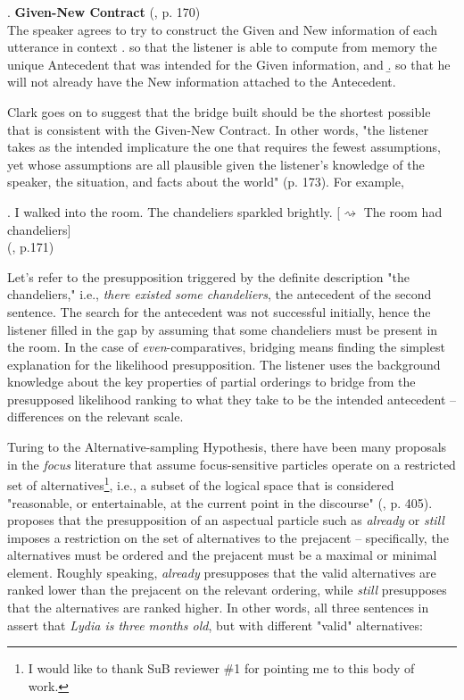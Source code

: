 \documentclass[12pt,letterpaper]{scrartcl}
\newcommand{\alignright}{\hspace*{\fill}}
\newcommand{\infer}{$\rightsquigarrow$ }
\begin{document}
\ex. \textbf{Given-New Contract} (\cite{clark_bridging_1975}, p. 170) \\
The speaker agrees to try to construct the Given and New information of each utterance in context
\a. so that the listener is able to compute from memory the unique Antecedent that was intended for the Given information, and
\b. so that he will not already have the New information attached to the Antecedent.

Clark goes on to suggest that the bridge built should be the shortest possible that is consistent with the Given-New Contract. In other words, "the listener takes as the intended implicature the one that requires the fewest assumptions, yet whose assumptions are all plausible given the listener's knowledge of the speaker, the situation, and facts about the world" (p. 173). For example,

\ex. I walked into the room. The chandeliers sparkled brightly. \alignright [\infer The room had chandeliers]\\
\alignright (\cite{clark_bridging_1975}, p.171)

Let's refer to the presupposition triggered by the definite description "the chandeliers," i.e., \textit{there existed some chandeliers}, the antecedent of the second sentence. The search for the antecedent was not successful initially, hence the listener filled in the gap by assuming that some chandeliers must be present in the room. In the case of \textit{even}-comparatives, bridging means finding the simplest explanation for the likelihood presupposition. The listener uses the background knowledge about the key properties of partial orderings to bridge from the presupposed likelihood ranking to what they take to be the intended antecedent -- differences on the relevant scale.



Turing to the Alternative-sampling Hypothesis, there have been many proposals in the \textit{focus} literature that assume focus-sensitive particles operate on a restricted set of alternatives\footnote{I would like to thank SuB reviewer \#1 for pointing me to this body of work.}, i.e., a subset of the logical space that is considered "reasonable, or entertainable, at the current point in the discourse" (\cite{krifka_alternatives_2000}, p. 405). \cite{krifka_alternatives_2000} proposes that the presupposition of an aspectual particle such as \textit{already} or \textit{still} imposes a restriction on the set of alternatives to the prejacent -- specifically, the alternatives must be ordered and the prejacent must be a maximal or minimal element. Roughly speaking, \textit{already} presupposes that the valid alternatives are ranked lower than the prejacent on the relevant ordering, while \textit{still} presupposes that the alternatives are ranked higher. In other words, all three sentences in \Next assert that \textit{Lydia is three months old}, but with different "valid" alternatives:
\end{document}
